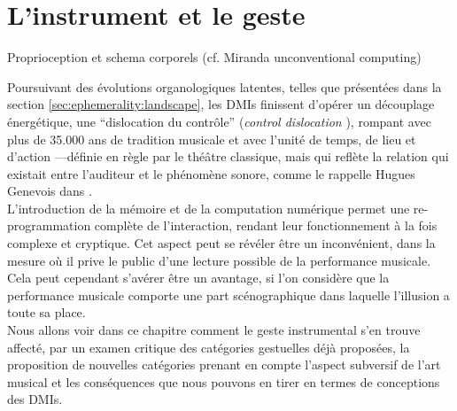 %
\chapter{L'instrument et le geste}
\label{ch:gesture}


Proprioception et schema corporels (cf. Miranda unconventional computing)


\noindent Poursuivant des évolutions organologiques latentes, telles que présentées dans la section \ref{sec:ephemerality:landscape}, les \glspl{DMI} finissent d'opérer un découplage énergétique, une ``dislocation du contrôle'' (\textit{control dislocation} \cite{miranda_new_2006}), rompant avec plus de 35.000 ans de tradition musicale \cite{conard_new_2009} et avec l'unité de temps, de lieu et d'action —définie en règle par le théâtre classique, mais qui reflète la relation qui existait entre l'auditeur et le phénomène sonore, comme le rappelle Hugues Genevois dans \cite{cance_what_2012}.\\
\indent L'introduction de la mémoire et de la computation numérique permet une re-programmation complète de l'interaction, rendant leur fonctionnement à la fois complexe et cryptique. Cet aspect peut se révéler être un inconvénient, dans la mesure où il prive le public d’une lecture possible de la performance musicale. Cela peut cependant s’avérer être un avantage, si l'on considère que la performance musicale comporte une part scénographique dans laquelle l’illusion a toute sa place.\\
\indent Nous allons voir dans ce chapitre comment le geste instrumental s'en trouve affecté, par un examen critique des catégories gestuelles déjà proposées, la proposition de nouvelles catégories prenant en compte l'aspect subversif de l'art musical et les conséquences que nous pouvons en tirer en termes de conceptions des DMIs.



